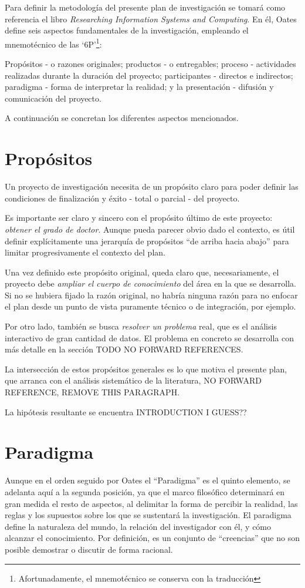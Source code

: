 Para definir la metodología del presente plan de investigación se tomará como
referencia el libro \textit{Researching Information Systems and Computing}\cite{Oates2006}.
En él, Oates define seis aspectos fundamentales de la investigación, empleando
el mnemotécnico de las `6P'\footnote{Afortunadamente, el mnemotécnico se conserva con la traducción}:

Propósitos - o razones originales; productos - o entregables; proceso - actividades
realizadas durante la duración del proyecto; participantes - directos e indirectos;
paradigma - forma de interpretar la realidad; y la presentación - difusión y
comunicación del proyecto.

A continuación se concretan los diferentes aspectos mencionados.

\section{Propósitos}
\label{subsec:proposito}
Un proyecto de investigación necesita de un propósito claro para poder
definir las condiciones de finalización y éxito - total o parcial - del proyecto.

Es importante ser claro y sincero con el propósito último de este proyecto:
\emph{obtener el grado de doctor}. Aunque pueda parecer obvio dado el
contexto, es útil definir explícitamente una jerarquía de propósitos
``de arriba hacia abajo'' para limitar progresivamente el contexto del plan.

Una vez definido este propósito original, queda claro que, necesariamente,
el proyecto debe \emph{ampliar el cuerpo de conocimiento} del área en la que
se desarrolla. Si no se hubiera fijado la razón original, no habría ninguna
razón para no enfocar el plan desde un punto de vista puramente técnico o de
integración, por ejemplo.

Por otro lado, también se busca \emph{resolver un problema} real, que es
el análisis interactivo de gran cantidad de datos. El problema en concreto
se desarrolla con más detalle en la sección TODO NO FORWARD REFERENCES.

La intersección de estos propósitos generales es lo que motiva el presente plan,
que arranca con el análisis sistemático de la literatura\cite{Alvarez2019},
NO FORWARD REFERENCE, REMOVE THIS PARAGRAPH.

La hipótesis resultante se encuentra INTRODUCTION I GUESS??

\section{Paradigma}
\label{subsec:paradigma}
Aunque en el orden seguido por Oates el ``Paradigma'' es el quinto elemento,
se adelanta aquí a la segunda posición, ya que el marco filosófico 
determinará en gran medida el resto de aspectos, al delimitar
la forma de percibir la realidad, las reglas y los supuestos sobre los que
se sustentará la investigación\cite{Oates2006}. El paradigma define la naturaleza
del mundo, la relación del investigador con él, y cómo alcanzar el conocimiento.
Por definición, es un conjunto de ``creencias'' que no son posible demostrar
o discutir de forma racional\cite{Guba1994}.

